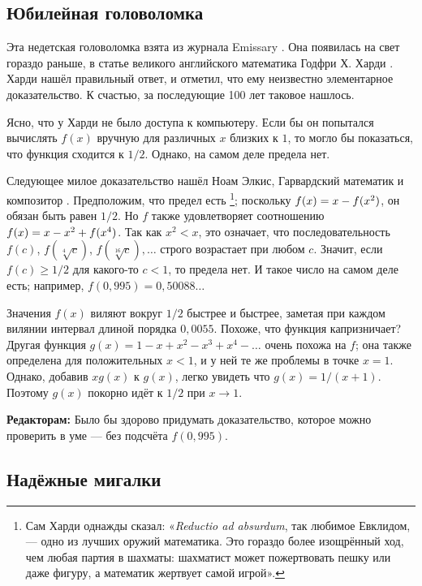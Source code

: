 \subsection*{Юбилейная головоломка}

Эта недетская головоломка взята из журнала Emissary \cite[Осень 2004]{berlekamp-buhle}.
Она появилась на свет гораздо раньше, в статье великого английского математика Годфри Х. Харди \cite{hardy}. 
Харди нашёл правильный ответ, и отметил, что ему неизвестно элементарное доказательство.
К счастью, за последующие 100 лет таковое нашлось.

Ясно, что у Харди не было доступа к компьютеру.
Если бы он попытался вычислять $f(x)$ вручную для различных $x$ близких к $1$, то могло бы показаться, что функция сходится к $1/2$.
Однако, на самом деле предела нет.

Следующее милое доказательство нашёл Ноам Элкис, Гарвардский математик и композитор \cite[Problem 8]{elkies}.
Предположим, что предел есть%
\footnote{Сам Харди однажды сказал: «\emph{Reductio ad absurdum}, так любимое Евклидом, --- одно из лучших оружий математика.
Это гораздо более изощрённый ход, чем любая партия в шахматы:
шахматист может пожертвовать пешку или даже фигуру, а математик жертвует самой игрой».};
поскольку $f(x)\z=x\z-f(x^2)$, он обязан быть равен $1/2$.
Но $f$ также удовлетворяет соотношению $f(x)\z=x\z-x^2\z+f(x^4)$.
Так как $x^2 < x$, это означает, что последовательность $f(c)$, $f(\sqrt[4]{c})$, $f(\sqrt[16]{c}),\dots$ строго возрастает при любом $c$.
Значит, если $f(c)\ge1/2$ для какого-то $c<1$, то предела нет.
И такое число на самом деле есть; например, $f(0{,}995)=0{,}50088\dots$

Значения $f(x)$ виляют вокруг $1/2$ быстрее и быстрее, заметая при каждом вилянии интервал длиной порядка $0{,}0055$. 
Похоже, что функция капризничает?
Другая функция $g(x)=1-x+x^2-x^3+x^4-\dots$ очень похожа на $f$;
она также определена для положительных $x < 1$, и у ней те же проблемы в точке $x = 1$.
Однако, добавив $xg(x)$ к $g(x)$, легко увидеть что $g(x)=1/(x+1)$.
Поэтому $g(x)$ покорно идёт к $1/2$ при $x \to 1$.

\begin{addedbytheeditors}
\textbf{Редакторам:}
Было бы здорово придумать доказательство, которое можно проверить в уме --- без подсчёта $f(0{,}995)$.
\end{addedbytheeditors}

\subsection*{Надёжные мигалки}

